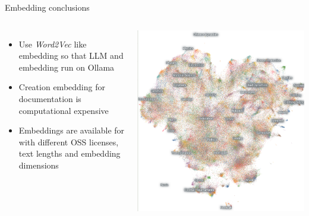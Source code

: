\documentclass[aspectratio=169]{beamer}
\begin{document}
\begin{frame}{Embedding conclusions}
\begin{columns}
\begin{itemize}
  \item Use \emph{Word2Vec} like embedding so that LLM and embedding run on Ollama
  \item Creation embedding for documentation is computational expensive
  \item Embeddings are available for with different OSS licenses, text lengths and embedding dimensions
\end{itemize}
  \includegraphics[width=\linewidth]{Noimic}
\end{columns}
\end{frame}
\end{document}
